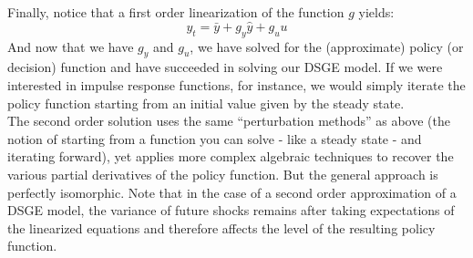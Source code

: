 Finally, notice that a first order linearization of the function $g$ yields:
\[
y_t = \bar y+g_y\hat y+g_u u
\]
And now that we have $g_y$ and $g_u$, we have solved for the (approximate) policy (or decision) function and have succeeded in solving our DSGE model. If we were interested in impulse response functions, for instance, we would simply iterate the policy function starting from an initial value given by the steady state. \\

The second order solution uses the same ``perturbation methods'' as above (the notion of starting from a function you can solve - like a steady state - and iterating forward), yet applies more complex algebraic techniques to recover the various partial derivatives of the policy function. But the general approach is perfectly isomorphic. Note that in the case of a second order approximation of a DSGE model, the variance of future shocks remains after taking expectations of the linearized equations and therefore affects the level of the resulting policy function.\\
